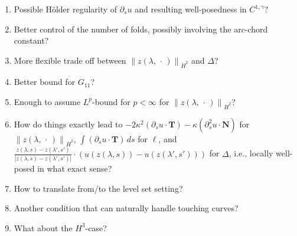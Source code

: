 \documentclass[reqno,centertags,12pt]{amsart}
\theoremstyle{definition}
\numberwithin{equation}{section}
\newcommand{\abs}[1]{\left\lvert#1\right\rvert}
\newcommand{\norm}[1]{\left\|#1\right\|}
\begin{document}
\begin{enumerate}
    \item Possible H\"{o}lder regularity of $\partial_{s}u$ and resulting
    well-posedness in $C^{1,\gamma}$?
    
    \item Better control of the number of folds, possibly involving the arc-chord constant?

    \item More flexible trade off between $\norm{z(\lambda,\,\cdot\,)}_{\dot{H}^{2}}$
    and $\Delta$?

    \item Better bound for $G_{11}$?

    \item Enough to assume $L^{p}$-bound for $p<\infty$ for
    $\norm{z(\lambda,\,\cdot\,)}_{\dot{H}^{2}}$?

    \item How do things exactly lead to $-2\kappa^{2}(\partial_{s}u\cdot\mathbf{T})
    -\kappa(\partial_{s}^{2}u\cdot\mathbf{N})$ for
    $\norm{z(\lambda,\,\cdot\,)}_{\dot{H}^{2}}$,
    $\int(\partial_{s}u\cdot\mathbf{T})\,ds$ for $\ell$, and
    $\frac{z(\lambda,s) - z(\lambda',s')}{\abs{z(\lambda,s) - z(\lambda',s')}}
    \cdot(u(z(\lambda,s)) - u(z(\lambda',s')))$ for $\Delta$,
    i.e., locally well-posed in what exact sense?

    \item How to translate from/to the level set setting?

    \item Another condition that can naturally handle touching curves?

    \item What about the $H^{3}$-case?
\end{enumerate}
\end{document}
